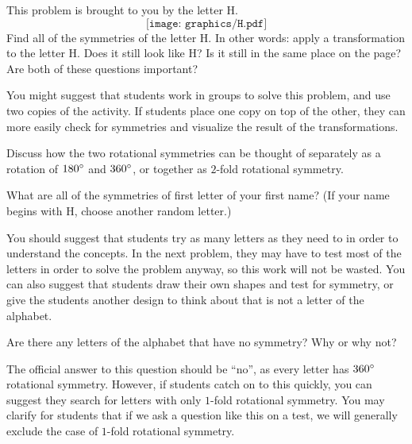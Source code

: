 \documentclass{ximera}
\begin{document}
\begin{problem}
This problem is brought to you by the letter H.
\[
\texttt{[image: graphics/H.pdf]}
\]
Find all of the symmetries of the letter H.  In other words: apply a transformation to the letter H.  Does it still look like H?  Is it still in the same place on the page?  Are both of these questions important?

\begin{instructorNotes}
You might suggest that students work in groups to solve this problem, and use two copies of the activity.  If students place one copy on top of the other, they can more easily check for symmetries and visualize the result of the transformations.

Discuss how the two rotational symmetries can be thought of separately as a rotation of $180\degree$ and $360\degree$, or together as $2$-fold rotational symmetry. 
\end{instructorNotes}
\end{problem}

\begin{problem}
What are all of the symmetries of first letter of your first name?  (If your name begins with H, choose another random letter.)

\begin{instructorNotes}
You should suggest that students try as many letters as they need to in order to understand the concepts.  In the next problem, they may have to test most of the letters in order to solve the problem anyway, so this work will not be wasted.  You can also suggest that students draw their own shapes and test for symmetry, or give the students another design to think about that is not a letter of the alphabet.
\end{instructorNotes}
\end{problem}

\begin{problem}
Are there any letters of the alphabet that have no symmetry?  Why or why not?
\begin{instructorNotes}
The official answer to this question should be ``no'', as every letter has $360\degree$ rotational symmetry.  However, if students catch on to this quickly, you can suggest they search for letters with only $1$-fold rotational symmetry.  You may clarify for students that if we ask a question like this on a test, we will generally exclude the case of $1$-fold rotational symmetry.
\end{instructorNotes}
\end{problem}
\end{document}
